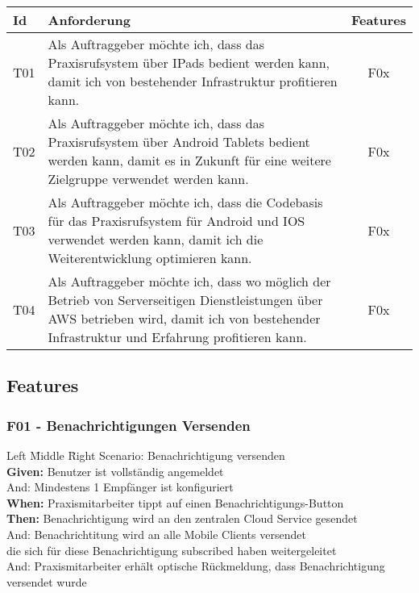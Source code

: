 \begin{table}[h]
    \centering
    \begin{tabular}{|l|p{13cm}|c|}
        \hline
        \textbf{Id} & \textbf{Anforderung}                                                              & \textbf{Features} \\
        \hline
        T01         & Als Auftraggeber möchte ich, dass das Praxisrufsystem über IPads bedient werden kann, damit ich von bestehender Infrastruktur profitieren kann. & F0x \\
        \hline
        T02         & Als Auftraggeber möchte ich, dass das Praxisrufsystem über Android Tablets bedient werden kann, damit es in Zukunft für eine weitere Zielgruppe verwendet werden kann. & F0x \\
        \hline
        T03         & Als Auftraggeber möchte ich, dass die Codebasis für das Praxisrufsystem für Android und IOS verwendet werden kann, damit ich die Weiterentwicklung optimieren kann. & F0x \\
        \hline
        T04         & Als Auftraggeber möchte ich, dass wo möglich der Betrieb von Serverseitigen Dienstleistungen über AWS betrieben wird, damit ich von bestehender Infrastruktur und Erfahrung profitieren kann. & F0x               \\
        \hline
    \end{tabular}\label{tab:userstories3}
\end{table}

\clearpage

\subsection{Features}\label{subsec:features}

    \subsubsection*{F01 - Benachrichtigungen Versenden}
        \begin{tabbing}
            Left \= Middle \= Right \kill
            Scenario: \> \> Benachrichtigung versenden\\
            \textbf{Given:}  \> \> Benutzer ist vollständig angemeldet\\
            And:    \> \> Mindestens 1 Empfänger ist konfiguriert\\
            \textbf{When:}  \> \> Praxismitarbeiter tippt auf einen Benachrichtigungs-Button\\
            \textbf{Then:}   \> \> Benachrichtigung wird an den zentralen Cloud Service gesendet\\
            And:    \> \> Benachrichtitung wird an alle Mobile Clients versendet\\
                 \> \> \> die sich für diese Benachrichtigung subscribed haben weitergeleitet\\
            And:    \> \> Praxismitarbeiter erhält optische Rückmeldung, dass Benachrichtigung versendet wurde\\
        \end{tabbing}



